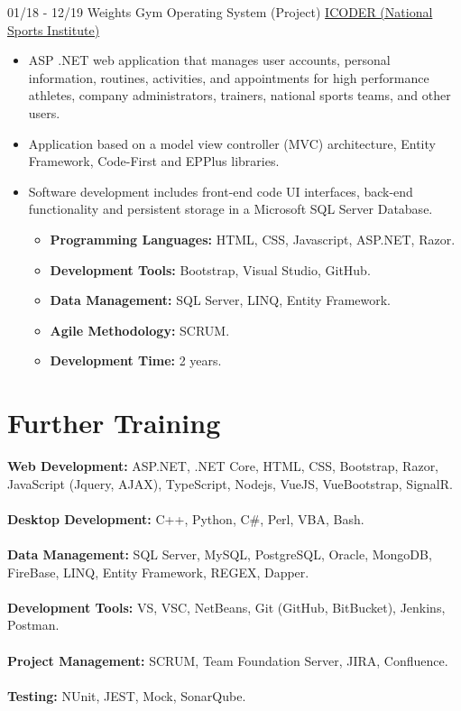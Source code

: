 \documentclass[letterpaper]{twentysecondcv} %
\begin{document}
\begin{twenty}
    \twentyitem
    	{01/18 - 12/19}
        {Weights Gym Operating System (Project)}
        { \href{https://www.icoder.go.cr/}{ICODER (National Sports Institute)} }
        {
            \begin{itemize}
                \item ASP .NET web application that manages user accounts, personal information, routines, activities, and appointments for high performance athletes, company administrators, trainers, national sports teams, and other users.
                \item Application based on a model view controller (MVC) architecture, Entity Framework, Code-First and EPPlus libraries.
                \item Software development includes front-end code UI interfaces, back-end functionality and persistent storage in a Microsoft SQL Server Database.
                    \begin{itemize}
                        \item \textbf{Programming Languages:} HTML, CSS, Javascript, ASP.NET, Razor.
                        \item \textbf{Development Tools:} Bootstrap, Visual Studio, GitHub.
                        \item \textbf{Data Management:} SQL Server, LINQ, Entity Framework.
                        \item \textbf{Agile Methodology:} SCRUM.
                        \item \textbf{Development Time:} 2 years.
                \end{itemize}
            \end{itemize}
        }

\end{twenty}

\section{Further Training}
{
   {\textbf{Web Development:}} ASP.NET, .NET Core, HTML, CSS, Bootstrap, Razor, JavaScript (Jquery, AJAX), TypeScript, Nodejs, VueJS, VueBootstrap, SignalR.\\\\
   {\textbf{Desktop Development:}} C++, Python, C\#, Perl, VBA, Bash.\\\\
   {\textbf{Data Management:}} SQL Server, MySQL, PostgreSQL, Oracle, MongoDB, FireBase, LINQ, Entity Framework, REGEX, Dapper.\\\\
   {\textbf{Development Tools:}} VS, VSC, NetBeans, Git (GitHub, BitBucket), Jenkins, Postman.\\\\
   {\textbf{Project Management:}} SCRUM, Team Foundation Server, JIRA, Confluence.\\\\
   {\textbf{Testing:}} NUnit, JEST, Mock, SonarQube.
}
\end{document}
